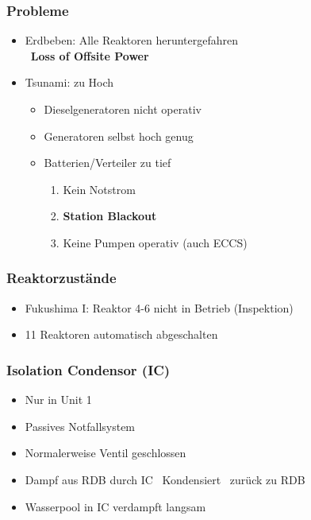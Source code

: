 \documentclass[12pt]{article}
\begin{document}
\subsubsection{Probleme}
\begin{itemize}[noitemsep]
	\item Erdbeben: Alle Reaktoren heruntergefahren\\
		\textrightarrow\ \textbf{Loss of Offsite Power}
	\item Tsunami: zu Hoch
		\begin{itemize}[noitemsep]
			\item Dieselgeneratoren nicht operativ
			\item Generatoren selbst hoch genug
			\item Batterien/Verteiler zu tief
				\begin{enumerate}[label = \textrightarrow]
					\item Kein Notstrom
					\item \textbf{Station Blackout}
					\item Keine Pumpen operativ (auch ECCS)
				\end{enumerate}
		\end{itemize}
\end{itemize}

\subsubsection{Reaktorzustände}
\begin{itemize}[noitemsep]
	\item Fukushima I: Reaktor 4-6 nicht in Betrieb (Inspektion)
	\item 11 Reaktoren automatisch abgeschalten
\end{itemize}

\subsubsection{Isolation Condensor (IC)}
\begin{itemize}[noitemsep]
	\item Nur in Unit 1
	\item Passives Notfallsystem
	\item Normalerweise Ventil geschlossen
	\item Dampf aus RDB durch IC \textrightarrow\ Kondensiert \textrightarrow\ zurück zu RDB
	\item Wasserpool in IC verdampft langsam
\end{itemize}
\end{document}

